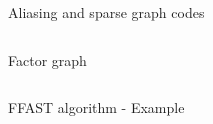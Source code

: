 \documentclass[10pt,xcolor=table]{beamer}
\begin{document}
\begin{frame}{Aliasing and sparse graph codes}
\begin{columns}
		\begin{block}{\small Factor graph}
			
			\begin{figure}[t]
				\begin{center}
					\resizebox{1.0\textwidth}{!}{}
					\end{center}
				\end{figure}
		\end{block}
	\end{columns}
\end{frame}
	
	
	\begin{frame}{FFAST algorithm - Example}

\begin{figure}[t]
	\begin{center}
		\resizebox{0.75\textwidth}{!}{}
	\end{center}
\end{figure}
	\vspace*{-4mm}
\begin{figure}[t]
	\begin{center}
		\resizebox{0.52\textwidth}{!}{}
	\end{center}
\end{figure}
	
	\end{frame}
\end{document}
